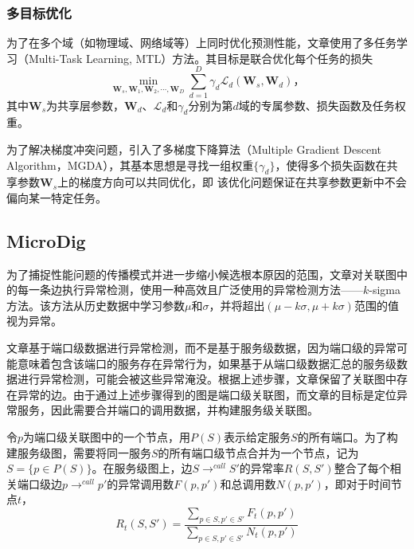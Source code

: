 \subsubsection{多目标优化}

为了在多个域（如物理域、网络域等）上同时优化预测性能，文章使用了多任务学习（Multi-Task Learning, MTL）方法。其目标是联合优化每个任务的损失
\begin{equation*}
    \min_{\bm{W}_s,\bm{W}_1,\bm{W}_2,\cdots,\bm{W}_D}\sum_{d=1}^D\gamma_d\mathcal{L}_d(\bm{W}_s,\bm{W}_d) \text{，}
\end{equation*}
其中$\bm{W}_s$为共享层参数，$\bm{W}_d$、$\mathcal{L}_d$和$\gamma_d$分别为第$d$域的专属参数、损失函数及任务权重。

为了解决梯度冲突问题，引入了多梯度下降算法（Multiple Gradient Descent Algorithm，MGDA）\cite{desideri2012multiple}，其基本思想是寻找一组权重$\{\gamma_d\}$，使得多个损失函数在共享参数$\bm{W}_s$上的梯度方向可以共同优化，即
该优化问题保证在共享参数更新中不会偏向某一特定任务。

\subsection{MicroDig}

为了捕捉性能问题的传播模式并进一步缩小候选根本原因的范围，文章对关联图中的每一条边执行异常检测，使用一种高效且广泛使用的异常检测方法——$k$-sigma方法。该方法从历史数据中学习参数$\mu$和$\sigma$，并将超出$(\mu-k\sigma,\mu+k\sigma)$范围的值视为异常。

文章基于端口级数据进行异常检测，而不是基于服务级数据，因为端口级的异常可能意味着包含该端口的服务存在异常行为，如果基于从端口级数据汇总的服务级数据进行异常检测，可能会被这些异常淹没。根据上述步骤，文章保留了关联图中存在异常的边。由于通过上述步骤得到的图是端口级关联图，而文章的目标是定位异常服务，因此需要合并端口的调用数据，并构建服务级关联图。

令$p$为端口级关联图中的一个节点，用$P(S)$表示给定服务$S$的所有端口。为了构建服务级图，需要将同一服务$S$的所有端口级节点合并为一个节点，记为$S = \{p\in P(S)\}$。在服务级图上，边$S\to^{call}S'$的异常率$R(S, S')$整合了每个相关端口级边$p\to^{call}p'$的异常调用数$F(p, p')$和总调用数$N(p, p')$，即对于时间节点$t$，
\begin{equation*}
    R_t(S, S')=\frac{\sum_{p\in S,p'\in S'}F_t(p,p')}{\sum_{p\in S,p'\in S'}N_t(p,p')}
\end{equation*}

